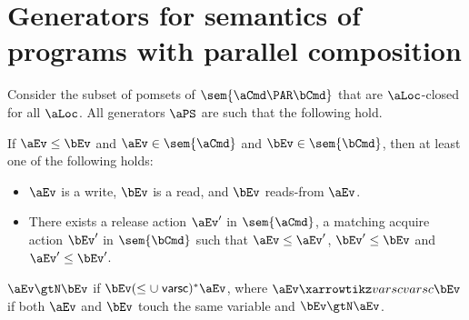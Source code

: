 \section{Generators for semantics of programs with parallel composition}
\begin{lemma}
Consider the subset of pomsets of $\sem{\aCmd \PAR \bCmd}$ that are  $\aLoc$-closed for all $\aLoc$.  
All generators $\aPS$   are such that the following hold.

If $\aEv\le\bEv$ and $\aEv \in \sem{\aCmd}$ and  $\bEv \in \sem{\bCmd}$, then at least one of the following holds:
\begin{itemize}
\item  $\aEv$ is a write, $\bEv$ is a read, and $\bEv$ reads-from $\aEv$.
\item There exists a release action $\aEv'$ in $\sem{\aCmd}$, a matching acquire action $\bEv'$ in $\sem{\bCmd}$ such that $\aEv \le \aEv'$, $\bEv' \le \bEv$ and $\aEv' \le \bEv'$.
\end{itemize}

$\aEv \gtN \bEv$ if $ \bEv (\le \cup \rvarsc)^* \aEv$, where
            $ \aEv \xvarsc  \bEv$ if both $\aEv$ and $\bEv$ touch the same variable and $\bEv \gtN \aEv$.

\end{lemma}

\endinput








\begin{definition}
$ \aEv \xvarsc  \bEv$ if both $\aEv$ and $\bEv$ touch the same variable and $\aEv \xird \bEv$ or $\aEv \xrb \bEv$ or $\aEv\xird \bEv$ or $\bEv \gtN \aev$.
\end{definition}

